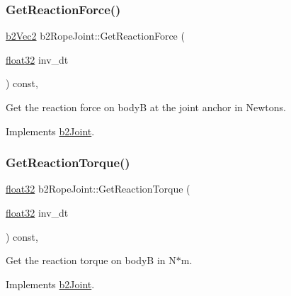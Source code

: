 \mbox{\label{classb2_rope_joint_a4637fe7f22383bbc00d23ab4961b1146}} 
\subsubsection{\texorpdfstring{GetReactionForce()}{GetReactionForce()}}
{\footnotesize\ttfamily \mbox{\hyperlink{structb2_vec2}{b2\+Vec2}} b2\+Rope\+Joint\+::\+Get\+Reaction\+Force (\begin{DoxyParamCaption}\item[{\mbox{\hyperlink{b2_settings_8h_aacdc525d6f7bddb3ae95d5c311bd06a1}{float32}}}]{inv\+\_\+dt }\end{DoxyParamCaption}) const\hspace{0.3cm}{\ttfamily [override]}, {\ttfamily [virtual]}}



Get the reaction force on bodyB at the joint anchor in Newtons. 



Implements \mbox{\hyperlink{classb2_joint_a7e0eddefb9b69ad050b8ef6425838a74}{b2\+Joint}}.

\mbox{\label{classb2_rope_joint_ab3d2e29e34ab2fc6a2e23c055d865c18}} 
\subsubsection{\texorpdfstring{GetReactionTorque()}{GetReactionTorque()}}
{\footnotesize\ttfamily \mbox{\hyperlink{b2_settings_8h_aacdc525d6f7bddb3ae95d5c311bd06a1}{float32}} b2\+Rope\+Joint\+::\+Get\+Reaction\+Torque (\begin{DoxyParamCaption}\item[{\mbox{\hyperlink{b2_settings_8h_aacdc525d6f7bddb3ae95d5c311bd06a1}{float32}}}]{inv\+\_\+dt }\end{DoxyParamCaption}) const\hspace{0.3cm}{\ttfamily [override]}, {\ttfamily [virtual]}}



Get the reaction torque on bodyB in N$\ast$m. 



Implements \mbox{\hyperlink{classb2_joint_ae355e441c2aa842777dc04e24f15ced0}{b2\+Joint}}.

